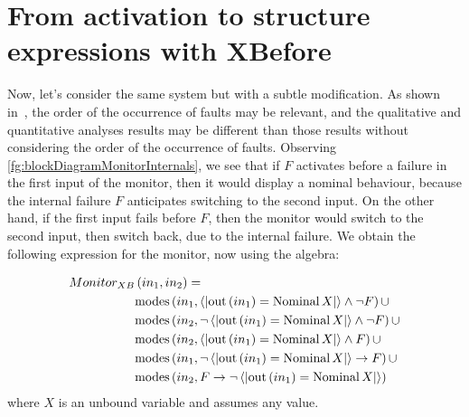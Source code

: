 \documentclass[12pt,openright,twoside,a4paper,oldfontcommands,english,brazil,final]{abntex2}
\theoremstyle{theo}
\def\xbeforeop{\ensuremath\rightarrow}
\newcommand{\xbefore}[2]{\ensuremath #1 \xbeforeop #2 }
\newcommand{\Nominal}[1]{\ensuremath\mathop{\mathrm{Nominal}} #1}
\newcommand{\predicate}[2]{\ensuremath\left\langle\left| \mathrm{out}\left(#1\right) = #2 \right|\right\rangle}
\newcommand{\modes}[2]{\ensuremath\mathrm{modes}\left(#1,#2\right)}
\begin{document}
\section{From \ac*{activation} to structure expressions with \ac*{XBefore}}
\label{sec:activation-to-structure-expressions-algebra-operators}

Now, let's consider the same system but with a subtle modification.
As shown in~\cite{DM2016}, the order of the occurrence of faults may be relevant, and the qualitative and quantitative analyses results may be different than those results without considering the order of the occurrence of faults.
Observing \cref{fg:blockDiagramMonitorInternals}, we see that if $F$ activates before a failure in the first input of the monitor, then it would display a nominal behaviour, because the internal failure $F$ anticipates switching to the second input.
On the other hand, if the first input fails before $F$, then the monitor would switch to the second input, then switch back, due to the internal failure.
We obtain the following expression for the monitor, now using the \ac{algebra}:

%
\begin{equation}
\label{eq:monitor-algebra}
\begin{split}
Monitor_{XB} &\left(in_1, in_2\right) = \\
  & \modes{in_1}{\predicate{in_1}{\Nominal{X}} \land \lnot F} \cup\\
  & \modes{in_2}{\lnot \predicate{in_1}{\Nominal{X}} \land \lnot F} \cup\\
  & \modes{in_2}{\predicate{in_1}{\Nominal{X}} \land F} \cup\\
  & \modes{in_1}{\xbefore{\lnot \predicate{in_1}{\Nominal{X}}}{F}} \cup \\
  & \modes{in_2}{\xbefore{F}{\lnot \predicate{in_1}{\Nominal{X}}}}
\end{split}
\end{equation}
where $X$ is an unbound variable and assumes any value.
\end{document}
